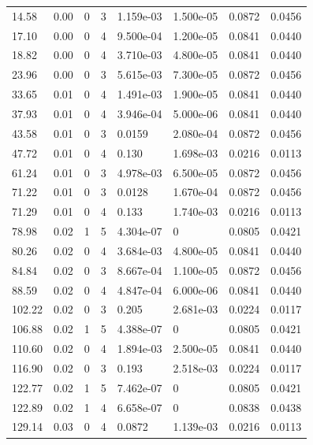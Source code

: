 \documentclass[preview]{standalone}
\begin{document}
{{\begin{tabular}{L{1.2cm}C{1.2cm} C{0.3cm}C{0.5cm} C{1.4cm}C{1.4cm} C{1.4cm}C{1.4cm}}
  14.58  &  0.00  & 0     &  3 &  1.159e-03  & 1.500e-05  & 0.0872 &  0.0456   \\ 
  17.10  &  0.00  & 0     &  4 &  9.500e-04  & 1.200e-05  & 0.0841 &  0.0440   \\ 
  18.82  &  0.00  & 0     &  4 &  3.710e-03  & 4.800e-05  & 0.0841 &  0.0440   \\ 
  23.96  &  0.00  & 0     &  3 &  5.615e-03  & 7.300e-05  & 0.0872 &  0.0456   \\ 
  33.65  &  0.01  & 0     &  4 &  1.491e-03  & 1.900e-05  & 0.0841 &  0.0440   \\ 
  37.93  &  0.01  & 0     &  4 &  3.946e-04  & 5.000e-06  & 0.0841 &  0.0440   \\ 
  43.58  &  0.01  & 0     &  3 &  0.0159  & 2.080e-04  & 0.0872 &  0.0456   \\ 
  47.72  &  0.01  & 0     &  4 &  0.130  & 1.698e-03  & 0.0216 &  0.0113   \\ 
  61.24  &  0.01  & 0     &  3 &  4.978e-03  & 6.500e-05  & 0.0872 &  0.0456   \\ 
  71.22  &  0.01  & 0     &  3 &  0.0128  & 1.670e-04  & 0.0872 &  0.0456   \\ 
  71.29  &  0.01  & 0     &  4 &  0.133  & 1.740e-03  & 0.0216 &  0.0113   \\ 
  78.98  &  0.02  & 1     &  5 &  4.304e-07  & 0  & 0.0805 &  0.0421   \\ 
  80.26  &  0.02  & 0     &  4 &  3.684e-03  & 4.800e-05  & 0.0841 &  0.0440   \\ 
  84.84  &  0.02  & 0     &  3 &  8.667e-04  & 1.100e-05  & 0.0872 &  0.0456   \\ 
  88.59  &  0.02  & 0     &  4 &  4.847e-04  & 6.000e-06  & 0.0841 &  0.0440   \\ 
  102.22  &  0.02  & 0     &  3 &  0.205  & 2.681e-03  & 0.0224 &  0.0117   \\ 
  106.88  &  0.02  & 1     &  5 &  4.388e-07  & 0  & 0.0805 &  0.0421   \\ 
  110.60  &  0.02  & 0     &  4 &  1.894e-03  & 2.500e-05  & 0.0841 &  0.0440   \\ 
  116.90  &  0.02  & 0     &  3 &  0.193  & 2.518e-03  & 0.0224 &  0.0117   \\ 
  122.77  &  0.02  & 1     &  5 &  7.462e-07  & 0  & 0.0805 &  0.0421   \\ 
  122.89  &  0.02  & 1     &  4 &  6.658e-07  & 0  & 0.0838 &  0.0438   \\ 
  129.14  &  0.03  & 0     &  4 &  0.0872  & 1.139e-03  & 0.0216 &  0.0113   \\ 

\end{tabular}}}
\end{document}

